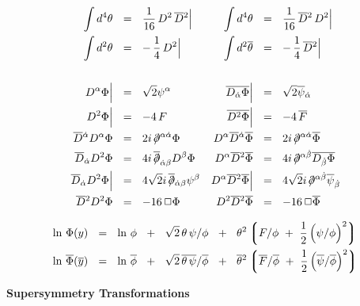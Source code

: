 \documentclass[14pt]{article}
\newcommand{\p}{\partial}
\newcommand{\mc}[1]{\mathcal{#1}}
\newcommand{\ov}{\overline}
\newcommand{\lgr}{\left\lgroup}
\newcommand{\rgr}{\right\rgroup}
\def\slashed#1{\setbox0=\hbox{$#1$}             %
   \dimen0=\wd0                                 %
   \setbox1=\hbox{/} \dimen1=\wd1               %
   \ifdim\dimen0>\dimen1                        %
      \rlap{\hbox to \dimen0{\hfil/\hfil}}      %
      #1                                        %
   \else                                        %
      \rlap{\hbox to \dimen1{\hfil$#1$\hfil}}   %
      /                                         %
   \fi}                                         %
\begin{document}
\begin{align*}
	\int d^4\theta & ~~=~~ \frac{1}{16}\, D^2\, \ov D{}^2 \Big|
	& 
	\int d^4\theta & ~~=~~ \frac{1}{16}\, \ov D{}^2\, D^2 \Big|
	\\
	\int d^2\theta & ~~=~~ -\,\frac{1}{4}\, D^2 \Big|
	&
	\int d^2\ov\theta & ~~=~~ -\,\frac{1}{4}\, \ov D{}^2 \Big|
	\\ \\
	D^\alpha \Phi \Big| & ~~=~~ \sqrt{2} \psi^\alpha     
	&
	\ov{D_{\dot{\alpha}}\Phi} \Big| & ~~=~~ \sqrt{2} \ov{\psi}{}_{\dot{\alpha}} \\
	D^2 \Phi \Big| & ~~=~~ -4\, F  
	&
	\ov{D^2 \Phi} \Big| & ~~=~~ -4\, \ov{F} \\
	\ov{D}{}^{\dot{\alpha}} D^{\alpha} \Phi & ~~=~~ 2i\, \slashed{\p}^{\alpha\dot{\alpha}} \Phi
	&
	D^{\alpha} \ov{D}{}^{\dot{\alpha}} \ov{\Phi} & ~~=~~ 2i\, \slashed{\p}^{\alpha\dot{\alpha}} \ov{\Phi} \\
	\ov{D}{}_{\dot{\alpha}} D^2 \Phi & ~~=~~ 4i\, \ov{\slashed{\p}}_{\dot{\alpha}\beta} D^\beta \Phi
	&
	D^\alpha \ov{D}{}^2 \ov{\Phi} & ~~=~~ 4i\, \slashed{\p}^{\alpha\dot{\beta}} \ov{D_{\dot{\beta}} \Phi}
	\\
	\ov{D}{}_{\dot{\alpha}} D^2 \Phi \Big| & ~~=~~ 4\sqrt{2}i\, \ov{\slashed{\p}}{}_{\dot{\alpha}\beta} \psi^\beta
	&
	D^\alpha \ov{D}{}^2 \ov{\Phi} \Big| & ~~=~~ 4\sqrt{2}i\, \slashed{\p}^{\alpha\dot{\beta}} \ov{\psi}{}_{\dot{\beta}}
	\\
	\ov{D}{}^2 D^2 \Phi & ~~=~~ -16\, \Box \Phi
	&
	D^2\ov{D}{}^2 \ov{\Phi} & ~~=~~ - 16\, \Box \ov{\Phi}
\end{align*}

\begin{align*}
	\ln\, \Phi(y)    & ~~=~~    \ln\, \phi  ~~+~~  \sqrt{2}\, \theta\, \psi / \phi  ~~+~~
				    \theta^2 \lgr F / \phi  ~+~  \frac{1}{2}\, \Big( \psi / \phi \Big)^2 \rgr 
	\\
	\ln\, \ov \Phi (\ov y)    & ~~=~~    \ln\, \ov\phi  ~~+~~  \sqrt{2}\, \ov{\theta\, \psi} / {\ov \phi}  ~~+~~
					     \ov\theta{}^2 \lgr \ov F / \ov \phi ~+~ \frac{1}{2}\, \Big( \ov \psi / \ov \phi \Big)^2 \rgr
\end{align*}


\pagebreak
\begin{center}
{\Large\bf \boldmath{$ \mc{N}=1 $} Supersymmetry Transformations}
\end{center} 
\end{document}
